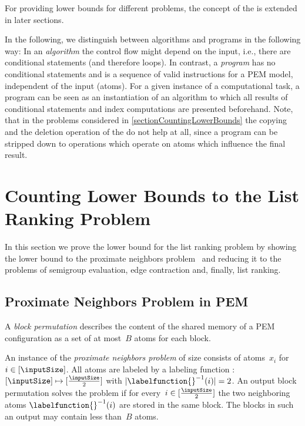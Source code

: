 \documentclass[envcountsame]{llncs}
\begin{document}
For providing lower bounds for different problems, the concept of the \linebreak\movePEM is extended in later sections.

In the following, we distinguish between {algorithms} and {programs} in the following way:
In an \emph{algorithm} the control flow might depend on the input, i.e., there are conditional statements (and therefore loops).
In contrast, a \emph{program} has no conditional statements and is a sequence of valid instructions for a PEM model, independent of the input (atoms). For a given instance of a computational task, a program can be seen as an instantiation of an algorithm to which all results of conditional statements and index computations are presented beforehand.
Note, that in the problems considered in \autoref{sectionCountingLowerBounds} the copying and the deletion operation of the \movePEM do not help at all, since a program can be stripped down to operations which operate on atoms which influence the final result. 





\section{Counting Lower Bounds to the List Ranking Problem}
\label{sectionCountingLowerBounds}
In this section we prove the lower bound for the list ranking problem by showing the lower bound to the proximate neighbors problem~\cite{1995ChiangExternalMemoryGraphAlgorithms} and reducing it to the problems of semigroup evaluation, edge contraction and, finally, list ranking. 


\subsection{Proximate Neighbors Problem in PEM}



\begin{definition}
  A \emph{block permutation} describes the content of the shared memory of a PEM configuration as a set of at most~$B$ atoms for each block.
\end{definition}

\begin{definition}
  An instance of the \emph{proximate neighbors problem} of size  consists of atoms~$x_i$ for $i\in[\inputSize]$.
  All atoms are labeled by a labeling function \mbox{: $[\inputSize] \mapsto [\frac{\inputSize}{2}]$} with $|\labelfunction{}^{-1}(i)|=2$.
  An output block permutation solves the problem if for every~$i\in[\frac{\inputSize}{2}]$ the two neighboring atoms $\labelfunction{}^{-1}(i)$ are stored in the same block. 
  The blocks in such an output may contain less than~$B$ atoms.
\end{definition}
\end{document}
